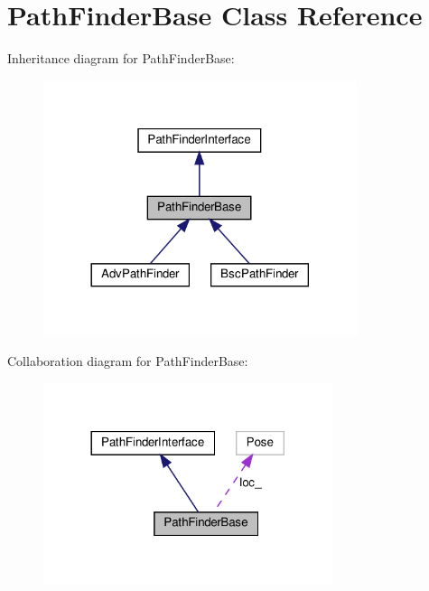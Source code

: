\hypertarget{classPathFinderBase}{}\section{Path\+Finder\+Base Class Reference}
\label{classPathFinderBase}


Inheritance diagram for Path\+Finder\+Base\+:\nopagebreak
\begin{figure}[H]
\begin{center}
\leavevmode
\includegraphics[width=260pt]{classPathFinderBase__inherit__graph}
\end{center}
\end{figure}


Collaboration diagram for Path\+Finder\+Base\+:\nopagebreak
\begin{figure}[H]
\begin{center}
\leavevmode
\includegraphics[width=240pt]{classPathFinderBase__coll__graph}
\end{center}
\end{figure}
